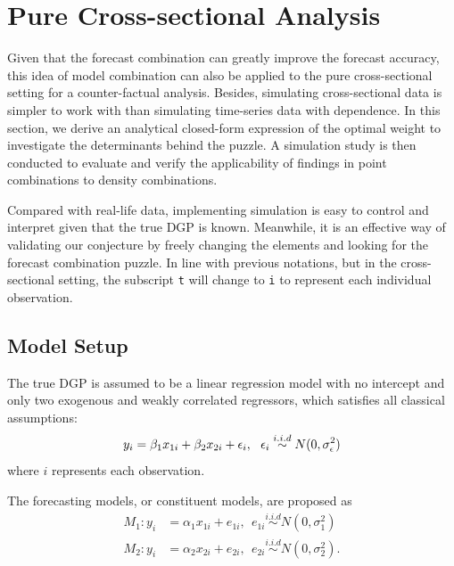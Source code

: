 \documentclass{monashthesis}
\begin{document}
\hypertarget{pure-cross-sectional-analysis}{%
\chapter{Pure Cross-sectional Analysis}\label{pure-cross-sectional-analysis}}

Given that the forecast combination can greatly improve the forecast accuracy, this idea of model combination can also be applied to the pure cross-sectional setting for a counter-factual analysis. Besides, simulating cross-sectional data is simpler to work with than simulating time-series data with dependence. In this section, we derive an analytical closed-form expression of the optimal weight to investigate the determinants behind the puzzle. A simulation study is then conducted to evaluate and verify the applicability of findings in point combinations to density combinations.

Compared with real-life data, implementing simulation is easy to control and interpret given that the true DGP is known. Meanwhile, it is an effective way of validating our conjecture by freely changing the elements and looking for the forecast combination puzzle. In line with previous notations, but in the cross-sectional setting, the subscript \texttt{t} will change to \texttt{i} to represent each individual observation.

\hypertarget{model-setup}{%
\section{Model Setup}\label{model-setup}}

The true DGP is assumed to be a linear regression model with no intercept and only two exogenous and weakly correlated regressors, which satisfies all classical assumptions:
\begin{equation}
\label{eqn:DGP}
y_i = \beta_1 x_{1i} + \beta_2 x_{2i} + \epsilon_i, \ \ \epsilon_i \stackrel{i.i.d}{\sim} N(0,\sigma^2_{\epsilon}) \\
\end{equation}
where \(i\) represents each observation.

\newpage

The forecasting models, or constituent models, are proposed as
\begin{align*}
M_1: y_i &= \alpha_1 x_{1i} + e_{1i}, \ \ e_{1i} \stackrel{i.i.d}{\sim} N(0,\sigma^2_1) \\
M_2: y_i &= \alpha_2 x_{2i} + e_{2i}, \ \ e_{2i} \stackrel{i.i.d}{\sim} N(0,\sigma^2_2).
\end{align*}
\end{document}

